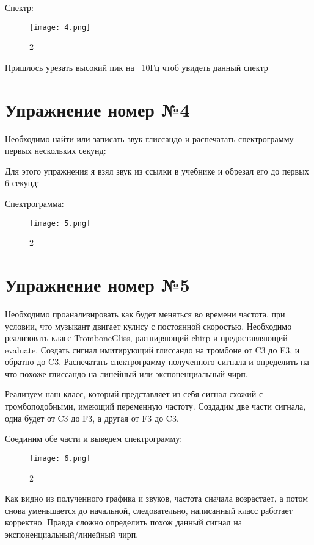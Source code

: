 ﻿\documentclass[10pt,a4paper,oneside]{article}
\begin{document}
Спектр: 
 
\begin{figure}[H]
        \centering
        \texttt{[image: 4.png]}
        \caption{2}
        \label{fig:first}
\end{figure}

Пришлось урезать высокий пик на ~10Гц чтоб увидеть данный спектр

\section{Упражнение номер №4}

Необходимо найти или записать звук глиссандо и распечатать спектрограмму первых нескольких секунд:

Для этого упражнения я взял звук из ссылки в учебнике и обрезал его до первых 6 секунд: 

Спектрограмма: 

\begin{figure}[H]
        \centering
        \texttt{[image: 5.png]}
        \caption{2}
        \label{fig:first}
\end{figure}

\section{Упражнение номер №5}

Необходимо проанализировать как будет меняться во времени частота, при условии, что музыкант двигает кулису с постоянной скоростью. Необходимо реализовать класс TromboneGliss, расширяющий chirp и предоставляющий evaluate. Создать сигнал имитирующий глиссандо на тромбоне от C3 до F3, и обратно до C3. Распечатать спектрограмму полученного сигнала и определить на что похоже глиссандо на линейный или экспоненциальный чирп.

Реализуем наш класс, который представляет из себя сигнал схожий с тромбоподобными, имеющий переменную частоту.
Создадим две части сигнала, одна будет от C3 до F3, а другая от F3 до C3.

Соединим обе части и выведем спектрограмму: 

\begin{figure}[H]
        \centering
        \texttt{[image: 6.png]}
        \caption{2}
        \label{fig:first}
\end{figure}

Как видно из полученного графика и звуков, частота сначала возрастает, а потом снова уменьшается до начальной, следовательно, написанный класс работает корректно. Правда сложно определить похож данный сигнал на экспоненциальный/линейный чирп.
\end{document}
